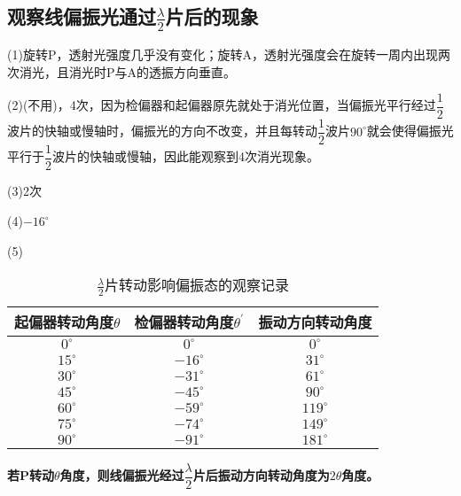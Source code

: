 \documentclass[UTF8]{ctexart}
\begin{document}
	\subsection{观察线偏振光通过$\frac{\lambda}{2}$片后的现象}
	(1)旋转P，透射光强度几乎没有变化；旋转A，透射光强度会在旋转一周内出现两次消光，且消光时P与A的透振方向垂直。
	\par (2)(不用)，4次，因为检偏器和起偏器原先就处于消光位置，当偏振光平行经过$\dfrac{1}{2}$波片的快轴或慢轴时，偏振光的方向不改变，并且每转动$\dfrac{1}{2}$波片$90^{\circ}$就会使得偏振光平行于$\dfrac{1}{2}$波片的快轴或慢轴，因此能观察到4次消光现象。
	\par (3)2次
	\par (4)$-16^{\circ}$
	\par (5)
	\begin{table}[H]
		\caption{$\frac{\lambda}{2}$片转动影响偏振态的观察记录}
		\centering
			\begin{tabular}{||c|c|c||}
				\toprule[0.5mm]
				起偏器转动角度$\theta$&检偏器转动角度$\theta^{\prime}$&振动方向转动角度\\
				\midrule
				$0^{\circ}$&$0^{\circ}$&$0^{\circ}$\\
				$15^{\circ}$&$-16^{\circ}$&$31^{\circ}$\\
				$30^{\circ}$&$-31^{\circ}$&$61^{\circ}$\\
				$45^{\circ}$&$-45^{\circ}$&$90^{\circ}$\\
				$60^{\circ}$&$-59^{\circ}$&$119^{\circ}$\\
				$75^{\circ}$&$-74^{\circ}$&$149^{\circ}$\\
				$90^{\circ}$&$-91^{\circ}$&$181^{\circ}$\\
				\bottomrule[0.5mm]
			\end{tabular}
	\end{table}
\par \textbf{若P转动$\theta$角度，则线偏振光经过$\dfrac{\lambda}{2}$片后振动方向转动角度为$2\theta$角度。}
\end{document}
